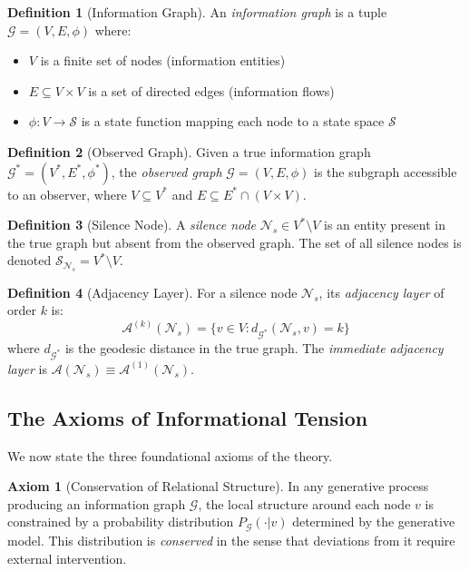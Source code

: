 \documentclass[12pt,a4paper]{article}
\theoremstyle{definition}
\newtheorem{axiom}{Axiom}
\newtheorem{definition}{Definition}[section]
\theoremstyle{remark}
\newcommand{\NS}{\mathcal{N}_s}          %
\newcommand{\CA}{\mathcal{A}}            %
\newcommand{\Graph}{\mathcal{G}}         %
\begin{document}
\begin{definition}[Information Graph]
An \emph{information graph} is a tuple $\Graph = (V, E, \phi)$ where:
\begin{itemize}
    \item $V$ is a finite set of nodes (information entities)
    \item $E \subseteq V \times V$ is a set of directed edges (information flows)
    \item $\phi: V \to \mathcal{S}$ is a state function mapping each node to a state space $\mathcal{S}$
\end{itemize}
\end{definition}

\begin{definition}[Observed Graph]
Given a true information graph $\Graph^* = (V^*, E^*, \phi^*)$, the \emph{observed graph} $\Graph = (V, E, \phi)$ is the subgraph accessible to an observer, where $V \subseteq V^*$ and $E \subseteq E^* \cap (V \times V)$.
\end{definition}

\begin{definition}[Silence Node]
A \emph{silence node} $\NS \in V^* \setminus V$ is an entity present in the true graph but absent from the observed graph. The set of all silence nodes is denoted $\mathcal{S}_{\NS} = V^* \setminus V$.
\end{definition}

\begin{definition}[Adjacency Layer]
For a silence node $\NS$, its \emph{adjacency layer} of order $k$ is:
\begin{equation}
    \CA^{(k)}(\NS) = \{ v \in V : d_{\Graph^*}(\NS, v) = k \}
\end{equation}
where $d_{\Graph^*}$ is the geodesic distance in the true graph. The \emph{immediate adjacency layer} is $\CA(\NS) \equiv \CA^{(1)}(\NS)$.
\end{definition}

\subsection{The Axioms of Informational Tension}

We now state the three foundational axioms of the theory.

\begin{axiom}[Conservation of Relational Structure]
\label{ax:conservation}
In any generative process producing an information graph $\Graph$, the local structure around each node $v$ is constrained by a probability distribution $P_{\Graph}(\cdot | v)$ determined by the generative model. This distribution is \emph{conserved} in the sense that deviations from it require external intervention.
\end{axiom}
\end{document}
